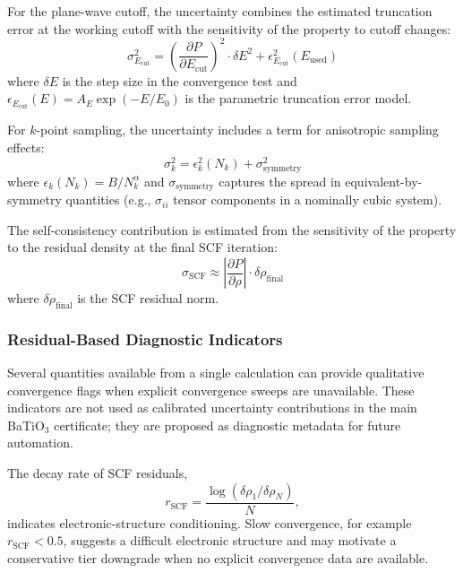﻿\documentclass[prb,onecolumn,superscriptaddress,amsmath,amssymb,longbibliography]{revtex4-2}
\newcommand{\Ecut}{E_{\mathrm{cut}}}
\newcommand{\Nk}{N_k}
\begin{document}
For the plane-wave cutoff, the uncertainty combines the estimated truncation
error at the working cutoff with the sensitivity of the property to cutoff
changes:
\begin{equation}
    \sigma_{\Ecut}^2 = \left(\frac{\partial P}{\partial \Ecut}\right)^2
    \cdot \delta E^2 + \epsilon_{\Ecut}^2(E_{\mathrm{used}})
\end{equation}
where $\delta E$ is the step size in the convergence test and
$\epsilon_{\Ecut}(E) = A_E \exp(-E/E_0)$ is the parametric truncation error
model.

For $k$-point sampling, the uncertainty includes a term for anisotropic
sampling effects:
\begin{equation}
    \sigma_k^2 = \epsilon_k^2(\Nk) + \sigma_{\mathrm{symmetry}}^2
\end{equation}
where $\epsilon_k(\Nk) = B/\Nk^\alpha$ and
$\sigma_{\mathrm{symmetry}}$ captures the spread in equivalent-by-symmetry
quantities (e.g., $\sigma_{ii}$ tensor components in a nominally cubic system).

The self-consistency contribution is estimated from the sensitivity of the
property to the residual density at the final SCF iteration:
\begin{equation}
    \sigma_{\mathrm{SCF}} \approx \left|\frac{\partial P}{\partial \rho}\right|
    \cdot \delta\rho_{\mathrm{final}}
\end{equation}
where $\delta\rho_{\mathrm{final}}$ is the SCF residual norm.

\subsubsection*{Residual-Based Diagnostic Indicators}

Several quantities available from a single calculation can provide qualitative
convergence flags when explicit convergence sweeps are unavailable. These
indicators are not used as calibrated uncertainty contributions in the main
BaTiO$_3$ certificate; they are proposed as diagnostic metadata for future
automation.

The decay rate of SCF residuals,
\begin{equation}
    r_{\mathrm{SCF}} = \frac{\log(\delta\rho_1 / \delta\rho_N)}{N},
    \label{eq:si_scf_rate}
\end{equation}
indicates electronic-structure conditioning. Slow convergence, for example
$r_{\mathrm{SCF}} < 0.5$, suggests a difficult electronic structure and may
motivate a conservative tier downgrade when no explicit convergence data are
available.
\end{document}
